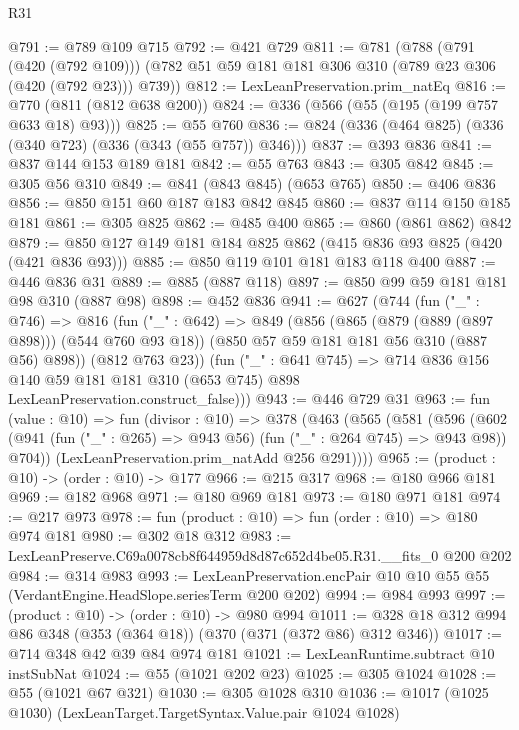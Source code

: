 \begin{lexlean}{R31}
\begin{coremodule}
@791 := @789 @109 @715
@792 := @421 @729
@811 := @781
    (@788
      (@791 (@420 (@792 @109)))
      (@782 @51 @59 @181 @181 @306 @310 (@789 @23 @306 (@420 (@792 @23))) @739))
@812 := LexLeanPreservation.prim_natEq
@816 := @770 (@811 (@812 @638 @200))
@824 := @336 (@566 (@55 (@195 (@199 @757 @633 @18) @93)))
@825 := @55 @760
@836 := @824 (@336 (@464 @825) (@336 (@340 @723) (@336 (@343 (@55 @757)) @346)))
@837 := @393 @836
@841 := @837 @144 @153 @189 @181
@842 := @55 @763
@843 := @305 @842
@845 := @305 @56 @310
@849 := @841 (@843 @845) (@653 @765)
@850 := @406 @836
@856 := @850 @151 @60 @187 @183 @842 @845
@860 := @837 @114 @150 @185 @181
@861 := @305 @825
@862 := @485 @400
@865 := @860 (@861 @862) @842
@879 := @850 @127 @149 @181 @184 @825 @862 (@415 @836 @93 @825 (@420 (@421 @836 @93)))
@885 := @850 @119 @101 @181 @183 @118 @400
@887 := @446 @836 @31
@889 := @885 (@887 @118)
@897 := @850 @99 @59 @181 @181 @98 @310 (@887 @98)
@898 := @452 @836
@941 := @627
    (@744
      (fun ("_" : @746) =>
      @816
        (fun ("_" : @642) =>
        @849
          (@856
            (@865 (@879 (@889 (@897 @898))) (@544 @760 @93 @18))
            (@850 @57 @59 @181 @181 @56 @310 (@887 @56) @898))
          (@812 @763 @23))
        (fun ("_" : @641 @745) =>
        @714
          @836
          @156
          @140
          @59
          @181
          @181
          @310
          (@653 @745)
          @898
          LexLeanPreservation.construct_false)))
@943 := @446 @729 @31
@963 := fun (value : @10) =>
  fun (divisor : @10) =>
  @378
    (@463
      (@565
        (@581
          (@596
            (@602 (@941 (fun ("_" : @265) => @943 @56) (fun ("_" : @264 @745) => @943 @98)) @704))
          (LexLeanPreservation.prim_natAdd @256 @291))))
@965 := (product : @10) -> (order : @10) -> @177
@966 := @215 @317
@968 := @180 @966 @181
@969 := @182 @968
@971 := @180 @969 @181
@973 := @180 @971 @181
@974 := @217 @973
@978 := fun (product : @10) => fun (order : @10) => @180 @974 @181
@980 := @302 @18 @312
@983 := LexLeanPreserve.C69a0078cb8f644959d8d87c652d4be05.R31.__fits_0 @200 @202
@984 := @314 @983
@993 := LexLeanPreservation.encPair @10 @10 @55 @55 (VerdantEngine.HeadSlope.seriesTerm @200 @202)
@994 := @984 @993
@997 := (product : @10) -> (order : @10) -> @980 @994
@1011 := @328 @18 @312 @994 @86 @348 (@353 (@364 @18)) (@370 (@371 (@372 @86) @312 @346))
@1017 := @714 @348 @42 @39 @84 @974 @181
@1021 := LexLeanRuntime.subtract @10 instSubNat
@1024 := @55 (@1021 @202 @23)
@1025 := @305 @1024
@1028 := @55 (@1021 @67 @321)
@1030 := @305 @1028 @310
@1036 := @1017 (@1025 @1030) (LexLeanTarget.TargetSyntax.Value.pair @1024 @1028)

\end{coremodule}
\end{lexlean}
